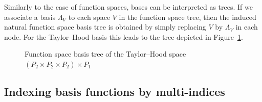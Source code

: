 \documentclass[a4paper,10pt,headings=normal,bibliography=totoc]{scrartcl}
\begin{document}
Similarly to the case of function spaces, bases can be interpreted as trees.
If we associate a basis $\Lambda_V$ to each space $V$ in the function space tree,
then the induced natural function space basis tree is obtained by simply replacing
$V$ by $\Lambda_V$ in each node. For the Taylor--Hood basis this leads to the
tree depicted in Figure~\ref{fig:taylor_hood_basis_tree}.

\begin{figure}
    \begin{center}
    \end{center}
    \caption{Function space basis tree of the Taylor--Hood space $(P_2 \times P_2 \times P_2)\times P_1$}
    \label{fig:taylor_hood_basis_tree}
\end{figure}



\subsection{Indexing basis functions by multi-indices}
\label{sec:index_trees}
\end{document}
